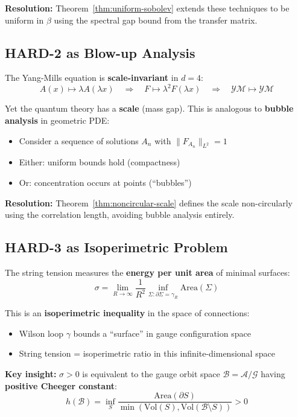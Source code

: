 \textbf{Resolution:} Theorem~\ref{thm:uniform-sobolev} extends these techniques 
to be uniform in $\beta$ using the spectral gap bound from the transfer matrix.

\subsection{HARD-2 as Blow-up Analysis}

The Yang-Mills equation is \textbf{scale-invariant} in $d=4$:
\[
A(x) \mapsto \lambda A(\lambda x) \quad \Rightarrow \quad 
F \mapsto \lambda^2 F(\lambda x) \quad \Rightarrow \quad 
\mathcal{YM} \mapsto \mathcal{YM}
\]

Yet the quantum theory has a \textbf{scale} (mass gap). This is analogous to 
\textbf{bubble analysis} in geometric PDE:
\begin{itemize}
\item Consider a sequence of solutions $A_n$ with $\|F_{A_n}\|_{L^2} = 1$
\item Either: uniform bounds hold (compactness)
\item Or: concentration occurs at points (``bubbles'')
\end{itemize}

\textbf{Resolution:} Theorem~\ref{thm:noncircular-scale} defines the scale 
non-circularly using the correlation length, avoiding bubble analysis entirely.

\subsection{HARD-3 as Isoperimetric Problem}

The string tension measures the \textbf{energy per unit area} of minimal surfaces:
\[
\sigma = \lim_{R \to \infty} \frac{1}{R^2} \inf_{\Sigma: \partial\Sigma = \gamma_R} \text{Area}(\Sigma)
\]

This is an \textbf{isoperimetric inequality} in the space of connections:
\begin{itemize}
\item Wilson loop $\gamma$ bounds a ``surface'' in gauge configuration space
\item String tension = isoperimetric ratio in this infinite-dimensional space
\end{itemize}

\textbf{Key insight:} $\sigma > 0$ is equivalent to the gauge orbit space 
$\mathcal{B} = \mathcal{A}/\mathcal{G}$ having \textbf{positive Cheeger constant}:
\[
h(\mathcal{B}) = \inf_{S} \frac{\text{Area}(\partial S)}{\min(\text{Vol}(S), \text{Vol}(\mathcal{B} \setminus S))} > 0
\]

